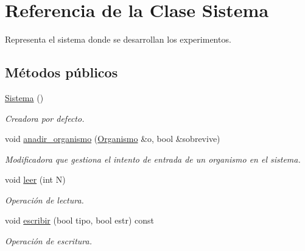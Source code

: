 \hypertarget{class_sistema}{}\section{Referencia de la Clase Sistema}
\label{class_sistema}


Representa el sistema donde se desarrollan los experimentos.  


\subsection*{Métodos públicos}
\begin{DoxyCompactItemize}
\item 
\hyperlink{class_sistema_a815b07845ef6b03247b239333fe75e28}{Sistema} ()
\begin{DoxyCompactList}\small\item\em Creadora por defecto. \end{DoxyCompactList}\item 
void \hyperlink{class_sistema_a6522b718fc0701d38c2e2d2c2d2e88a6}{anadir\+\_\+organismo} (\hyperlink{class_organismo}{Organismo} \&o, bool \&sobrevive)
\begin{DoxyCompactList}\small\item\em Modificadora que gestiona el intento de entrada de un organismo en el sistema. \end{DoxyCompactList}\item 
void \hyperlink{class_sistema_ae670549104642dd4664ac8f794b4b1e9}{leer} (int N)
\begin{DoxyCompactList}\small\item\em Operación de lectura. \end{DoxyCompactList}\item 
void \hyperlink{class_sistema_a3f2a05a17345ee3be8331950fb2eedc0}{escribir} (bool tipo, bool estr) const 
\begin{DoxyCompactList}\small\item\em Operación de escritura. \end{DoxyCompactList}\end{DoxyCompactItemize}

